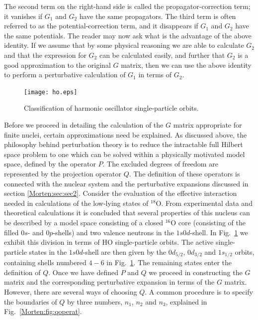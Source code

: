 The second term on the right-hand side is called the
propagator-correction term; 
it vanishes if $G_1$ and $G_2$ have the
same propagators. The third term is often referred to as the
potential-correction term, 
and it disappears if $G_1$ and $G_2$ have
the same potentials.
The reader may now ask what is the advantage of the above identity. If
we assume that by some physical reasoning we are able to calculate
$G_2$ and that the expression for $G_2$ can be calculated
easily, and further that $G_2$ is a good approximation
to the original $G$ matrix, then we can use the above identity to
perform a perturbative calculation of $G_1$ in terms of $G_2$.

\begin{figure}%
	\begin{center}
      	\texttt{[image: ho.eps]}
	\end{center}
\caption{Classification of harmonic oscillator single-particle
orbits.}
\label{Morten:fig:orbits}
\end{figure}



Before we proceed in detailing the calculation of the $G$ matrix
appropriate for finite nuclei, certain approximations need be explained.
As discussed above, the philosophy behind perturbation theory is
to reduce the intractable full Hilbert space problem to one which
can be solved within a physically motivated model space, defined by the
operator $P$. The excluded degrees of freedom are represented by the
projection operator $Q$. The definition of these operators is connected
with the nuclear system and the perturbative expansions discussed
in section \ref{Morten:sec:sec2}. Consider the evaluation of the effective interaction
needed in calculations of the low-lying states of $^{18}$O.
From experimental data and theoretical calculations it is concluded
that several properties of this nucleus can be described by a model
space consisting of a closed $^{16}$O core (consisting of the filled
$0s$- and $0p$-shells) and two valence neutrons in the $1s0d$-shell.
In Fig.~\ref{Morten:fig:orbits} we exhibit this division in terms of
HO single-particle orbits.  The active single-particle states in the $1s0d$-shell are then given
by the $0d_{5/2}$, $0d_{3/2}$ and $1s_{1/2}$ orbits, containing shells
numbered $4-6$ in Fig.~\ref{Morten:fig:orbits}.  The remaining states
enter the definition of $Q$. Once we have defined $P$ and $Q$ we
proceed in constructing the $G$ matrix and the corresponding
perturbative expansion in terms of the $G$ matrix.  However, there are
several ways of choosing $Q$. A common procedure is to specify the
boundaries of $Q$ by three numbers, $n_1$, $n_2$ and $n_3$, explained
in Fig.~\ref{Morten:fig:qoperat}.

